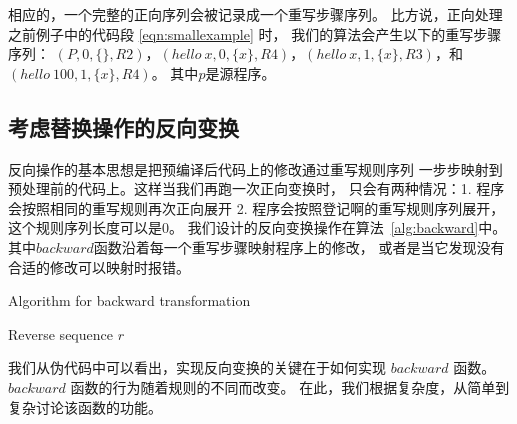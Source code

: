 相应的，一个完整的正向序列会被记录成一个重写步骤序列。
比方说，正向处理之前例子中的代码段 \ref{eqn:smallexample} 时，
我们的算法会产生以下的重写步骤序列：
$(P, 0, \{\}, R2)$，$(hello\ x, 0, \{x\}, R4)$，$(hello\ x, 1, \{x\}, R3)$，和
$(hello\ 100, 1, \{x\}, R4)$。
其中$p$是源程序。





\subsection{考虑替换操作的反向变换}\label{sec:backward}
反向操作的基本思想是把预编译后代码上的修改通过重写规则序列
一步步映射到预处理前的代码上。这样当我们再跑一次正向变换时，
只会有两种情况：1. 程序会按照相同的重写规则再次正向展开
2. 程序会按照登记啊的重写规则序列展开，这个规则序列长度可以是0。
我们设计的反向变换操作在算法~\ref{alg:backward}中。
其中$backward$函数沿着每一个重写步骤映射程序上的修改，
或者是当它发现没有合适的修改可以映射时报错。

\begin{algorithm}
  \newcommand\mycommfont[1]{\rmfamily{#1}}
  \caption{Algorithm for backward transformation \label{alg:backward}}
  Reverse sequence $r$\;
  \;
\end{algorithm}

我们从伪代码中可以看出，实现反向变换的关键在于如何实现 $backward$ 函数。
$backward$ 函数的行为随着规则的不同而改变。
在此，我们根据复杂度，从简单到复杂讨论该函数的功能。

